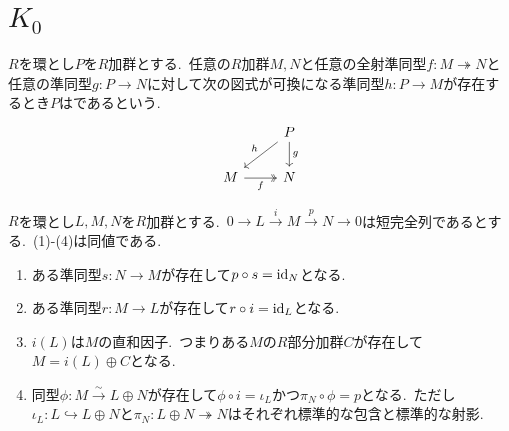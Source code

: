 
\section{\texorpdfstring{$K_0$}{K₀}}

\begin{definition} \label{def: IsProjective}
$R$を環とし$P$を$R$加群とする.\
任意の$R$加群$M,N$と任意の全射準同型$f \colon M \twoheadrightarrow N$と任意の準同型$g \colon P \to N$に対して次の図式が可換になる準同型$h \colon P \to M$が存在するとき$P$はであるという.
\[\begin{tikzcd}
	& P \\
	M & N
	\arrow["h"', from=1-2, to=2-1]
	\arrow["g", from=1-2, to=2-2]
	\arrow["f"', two heads, from=2-1, to=2-2]
\end{tikzcd}\]

\end{definition}

\begin{lemma} \label{lem: splitting_lemma}
$R$を環とし$L,M,N$を$R$加群とする.\
$0 \longrightarrow L \stackrel{i}{\longrightarrow} M \stackrel{p}{\longrightarrow} N \longrightarrow 0$は短完全列であるとする.\
(1)-(4)は同値である.
\def\labelenumi{(\theenumi)\hspace{.5\zw}}
\begin{enumerate}
	\item ある準同型$s \colon N \to M$が存在して$p \circ s = \operatorname{id}_N$となる.
	\item ある準同型$r \colon M \to L$が存在して$r \circ i = \operatorname{id}_L$となる.
	\item $i(L)$は$M$の直和因子.\
	つまりある$M$の$R$部分加群$C$が存在して$M = i(L) \oplus C$となる.
	\item 同型$\phi \colon M \stackrel{\sim}{\to} L \oplus N$が存在して$\phi \circ i = \iota_L$かつ$\pi_N \circ \phi = p$となる.\
	ただし$\iota_L \colon L \hookrightarrow L \oplus N$と$\pi_N \colon L \oplus N \twoheadrightarrow N$はそれぞれ標準的な包含と標準的な射影.
\end{enumerate}
\end{lemma}

